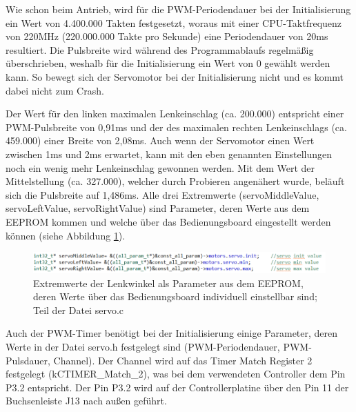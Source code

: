 Wie schon beim Antrieb, wird für die \ac{PWM}-Periodendauer bei der Initialisierung ein Wert von 4.400.000 Takten festgesetzt, woraus mit einer \ac{CPU}-Taktfrequenz von 220MHz (220.000.000 Takte pro Sekunde) eine Periodendauer von 20ms resultiert. Die Pulsbreite wird während des Programmablaufs regelmäßig überschrieben, weshalb für die Initialisierung ein Wert von 0 gewählt werden kann. So bewegt sich der Servomotor bei der Initialisierung nicht und es kommt dabei nicht zum Crash.\vspace{11pt}

Der Wert für den linken maximalen Lenkeinschlag (ca. 200.000) entspricht einer \ac{PWM}-Pulsbreite von 0,91ms und der des maximalen rechten Lenkeinschlags (ca. 459.000) einer Breite von 2,08ms. Auch wenn der Servomotor einen Wert zwischen 1ms und 2ms erwartet, kann mit den eben genannten Einstellungen noch ein wenig mehr Lenkeinschlag gewonnen werden. Mit dem Wert der Mittelstellung (ca. 327.000), welcher durch Probieren angenähert wurde, beläuft sich die Pulsbreite auf 1,486ms. Alle drei Extremwerte (\glqq{}servoMiddleValue\grqq{}, \glqq{}servoLeftValue\grqq{}, \glqq{}servoRightValue\grqq{}) sind Parameter, deren Werte aus dem \ac{EEPROM} kommen und welche über das Bedienungsboard eingestellt werden können (siehe Abbildung \ref{fig:ServoC0}).

\begin{figure}[H] %
\includegraphics[width=.95\textwidth]{sec5/images/ServoC0} 
\centering
\captionsetup{width=.95\textwidth}
\caption[Extremwerte der Lenkwinkel als Parameter aus dem \ac{EEPROM}]{Extremwerte der Lenkwinkel als Parameter aus dem \ac{EEPROM}, deren Werte über das Bedienungsboard individuell einstellbar sind; Teil der Datei \glqq{}servo.c\grqq{}}\centering
\label{fig:ServoC0}
\end{figure}

Auch der \ac{PWM}-Timer benötigt bei der Initialisierung einige Parameter, deren Werte in der Datei \glqq{}servo.h\grqq{} festgelegt sind (\ac{PWM}-Periodendauer, \ac{PWM}-Pulsdauer, Channel). Der Channel wird auf das Timer Match Register 2 festgelegt (\glqq{}kCTIMER\_Match\_2\grqq{}), was bei dem verwendeten Controller dem Pin P3.2 entspricht. Der Pin P3.2 wird auf der Controllerplatine über den Pin 11 der Buchsenleiste J13 nach außen geführt.

